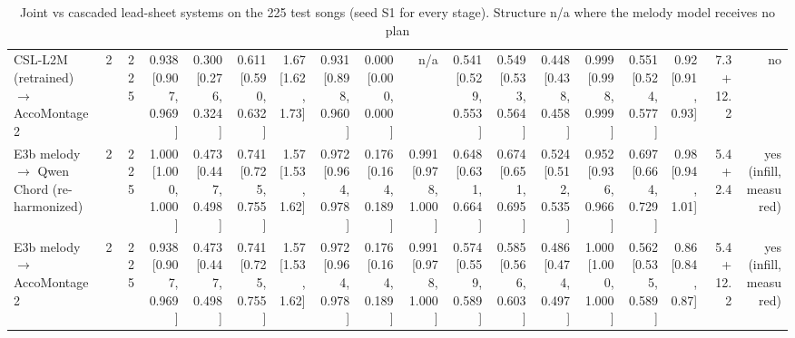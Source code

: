\begin{table}[t]
\begin{tabular}{lrrrrrrrrrrrrrrrrr}
CSL-L2M (retrained) $\rightarrow$ AccoMontage2 & 2 & 225 & 0.938 [0.907, 0.969] & 0.300 [0.276, 0.324] & 0.611 [0.590, 0.632] & 1.67 [1.62, 1.73] & 0.931 [0.898, 0.960] & 0.000 [0.000, 0.000] & n/a & 0.541 [0.529, 0.553] & 0.549 [0.533, 0.564] & 0.448 [0.438, 0.458] & 0.999 [0.998, 0.999] & 0.551 [0.524, 0.577] & 0.92 [0.91, 0.93] & 7.3 + 12.2 & no \\
E3b melody $\rightarrow$ Qwen Chord (re-harmonized) & 2 & 225 & 1.000 [1.000, 1.000] & 0.473 [0.447, 0.498] & 0.741 [0.725, 0.755] & 1.57 [1.53, 1.62] & 0.972 [0.964, 0.978] & 0.176 [0.164, 0.189] & 0.991 [0.978, 1.000] & 0.648 [0.631, 0.664] & 0.674 [0.651, 0.695] & 0.524 [0.512, 0.535] & 0.952 [0.936, 0.966] & 0.697 [0.664, 0.729] & 0.98 [0.94, 1.01] & 5.4 + 2.4 & yes (infill, measured) \\
E3b melody $\rightarrow$ AccoMontage2 & 2 & 225 & 0.938 [0.907, 0.969] & 0.473 [0.447, 0.498] & 0.741 [0.725, 0.755] & 1.57 [1.53, 1.62] & 0.972 [0.964, 0.978] & 0.176 [0.164, 0.189] & 0.991 [0.978, 1.000] & 0.574 [0.559, 0.589] & 0.585 [0.566, 0.603] & 0.486 [0.474, 0.497] & 1.000 [1.000, 1.000] & 0.562 [0.535, 0.589] & 0.86 [0.84, 0.87] & 5.4 + 12.2 & yes (infill, measured) \\
\bottomrule
\end{tabular}
\caption{Joint vs cascaded lead-sheet systems on the 225 test songs (seed S1 for every stage). Structure n/a where the melody model receives no plan}
\label{tab:joint_vs_cascade}
\end{table}

